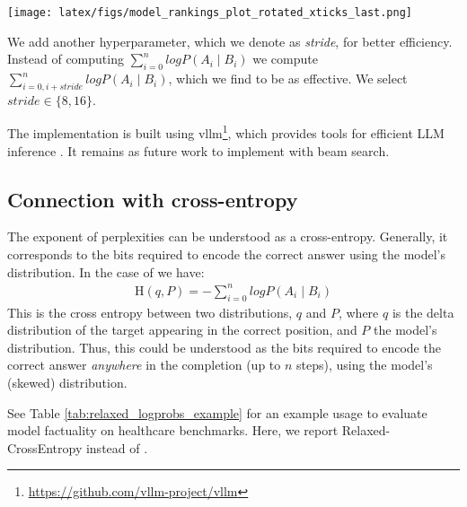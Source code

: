 \begin{figure*}[t]
    \centering
    \texttt{[image: latex/figs/model\_rankings\_plot\_rotated\_xticks\_last.png]}
    \caption{  
    Ranking results for all models on the OLAPH medical factuality dataset for all metrics. The top position is ranked as 1 and the lowest as 11. Different models are represented in distinct colors. It can be seen there is low agreement across metrics.
    }
    \label{fig:ranking}
\end{figure*} 



We add another hyperparameter, which we denote as \emph{stride}, for better efficiency. Instead of computing \( \sum_{i=0}^n log P(A_i \mid B_i)\) we compute \( \sum_{i=0,i+stride}^n log P(A_i \mid B_i)\), which we find to be as effective. We select $stride \in \{8, 16\}$.

The implementation is built using vllm\footnote{\href{https://github.com/vllm-project/vllm}{https://github.com/vllm-project/vllm}}, which provides tools for efficient LLM inference \cite{kwon2023efficient}. It remains as future work to implement \relaxed{} with beam search.

\subsection{Connection with cross-entropy}

The exponent of perplexities can be understood as a cross-entropy. Generally, it corresponds to the bits required to encode the correct answer using the model's distribution. In the case of \relaxed{} we have:
\begin{align*}
    \text{H}(q,P) = -\sum_{i=0}^n log P(A_i \mid B_i)
\end{align*}
This is the cross entropy between two distributions, $q$ and $P$, where $q$ is the delta distribution of the target appearing in the correct position, and $P$ the model's distribution. Thus, this could be understood as the bits required to encode the correct answer \emph{anywhere} in the completion (up to $n$ steps), using the model's (skewed) distribution. 


See Table \ref{tab:relaxed_logprobs_example} for an example usage to evaluate model factuality on healthcare benchmarks. Here, we report Relaxed-CrossEntropy instead of \relaxed{}.








